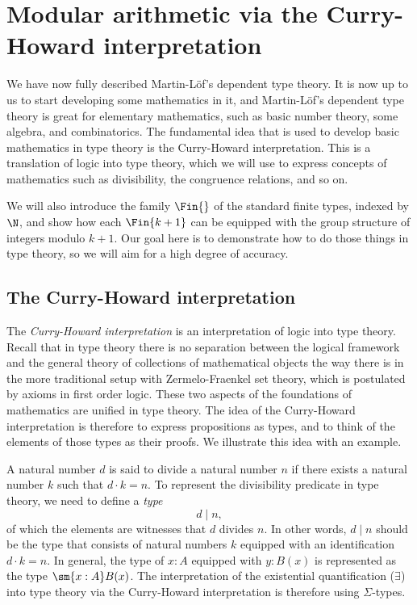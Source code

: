 \section{Modular arithmetic via the Curry-Howard interpretation}\label{sec:modular-arithmetic}

We have now fully described Martin-L\"of's dependent type theory. It is now up to us to start developing some mathematics in it, and Martin-L\"of's dependent type theory is great for elementary mathematics, such as basic number theory, some algebra, and combinatorics. The fundamental idea that is used to develop basic mathematics in type theory is the Curry-Howard interpretation. This is a translation of logic into type theory, which we will use to express concepts of mathematics such as divisibility, the congruence relations, and so on.

We will also introduce the family $\Fin{}$ of the standard finite types, indexed by $\N$, and show how each $\Fin{k+1}$ can be equipped with the group structure of integers modulo $k+1$. Our goal here is to demonstrate how to do those things in type theory, so we will aim for a high degree of accuracy.

\subsection{The Curry-Howard interpretation}\label{sec:Curry-Howard}

The \emph{Curry-Howard interpretation} is an interpretation of logic into type theory. Recall that in type theory there is no separation between the logical framework and the general theory of collections of mathematical objects the way there is in the more traditional setup with Zermelo-Fraenkel set theory, which is postulated by axioms in first order logic. These two aspects of the foundations of mathematics are unified in type theory. The idea of the Curry-Howard interpretation is therefore to express propositions as types, and to think of the elements of those types as their proofs. We illustrate this idea with an example.

\begin{eg}
  A natural number $d$ is said to divide a natural number $n$ if there exists a natural number $k$ such that $d\cdot k=n$. To represent the divisibility predicate in type theory, we need to define a \emph{type}
  \begin{equation*}
    d\mid n,
  \end{equation*}
  of which the elements are witnesses that $d$ divides $n$. In other words, $d\mid n$ should be the type that consists of natural numbers $k$ equipped with an identification $d\cdot k=n$. In general, the type of $x:A$ equipped with $y:B(x)$ is represented as the type $\sm{x:A}B(x)$. The interpretation of the existential quantification ($\exists$) into type theory via the Curry-Howard interpretation is therefore using $\Sigma$-types.
\end{eg}

